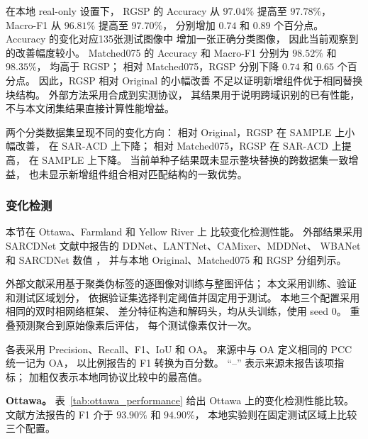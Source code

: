 \documentclass[journal]{IEEEtran}
\begin{document}
在本地 real-only 设置下，
RGSP 的 Accuracy 从 $97.04\%$ 提高至 $97.78\%$，
Macro-F1 从 $96.81\%$ 提高至 $97.70\%$，
分别增加 $0.74$ 和 $0.89$ 个百分点。
Accuracy 的变化对应135张测试图像中
增加一张正确分类图像，
因此当前观察到的改善幅度较小。
Matched075 的 Accuracy 和 Macro-F1
分别为 $98.52\%$ 和 $98.35\%$，
均高于 RGSP；
相对 Matched075，RGSP 分别下降
$0.74$ 和 $0.65$ 个百分点。
因此，RGSP 相对 Original 的小幅改善
不足以证明新增组件优于相同替换块结构。
外部方法采用合成到实测协议，
其结果用于说明跨域识别的已有性能，
不与本文闭集结果直接计算性能增益。

两个分类数据集呈现不同的变化方向：
相对 Original，RGSP 在 SAMPLE 上小幅改善，
在 SAR-ACD 上下降；
相对 Matched075，RGSP 在 SAR-ACD 上提高，
在 SAMPLE 上下降。
当前单种子结果既未显示整块替换的跨数据集一致增益，
也未显示新增组件组合相对匹配结构的一致优势。

\subsubsection{变化检测}
\label{sec:change_detection_results}

本节在 Ottawa、Farmland 和 Yellow River 上
比较变化检测性能。
外部结果采用 SARCDNet 文献中报告的
DDNet、LANTNet、CAMixer、MDDNet、
WBANet 和 SARCDNet 数值
\cite{sarcdnet2026}，
并与本地 Original、Matched075 和 RGSP 分组列示。

外部文献采用基于聚类伪标签的逐图像对训练与整图评估；
本文采用训练、验证和测试区域划分，
依据验证集选择判定阈值并固定用于测试。
本地三个配置采用相同的双时相网络框架、
差分特征构造和解码头，均从头训练，使用 seed 0。
重叠预测聚合到原始像素后评估，
每个测试像素仅计一次。

各表采用 Precision、Recall、F1、IoU 和 OA。
来源中与 OA 定义相同的 PCC 统一记为 OA，
以比例报告的 F1 转换为百分数。
``--'' 表示来源未报告该项指标；
加粗仅表示本地同协议比较中的最高值。

\textbf{Ottawa。}
表~\ref{tab:ottawa_performance}
给出 Ottawa 上的变化检测性能比较。
文献方法报告的 F1 介于 $93.90\%$ 和 $94.90\%$，
本地实验则在固定测试区域上比较三个配置。
\end{document}
